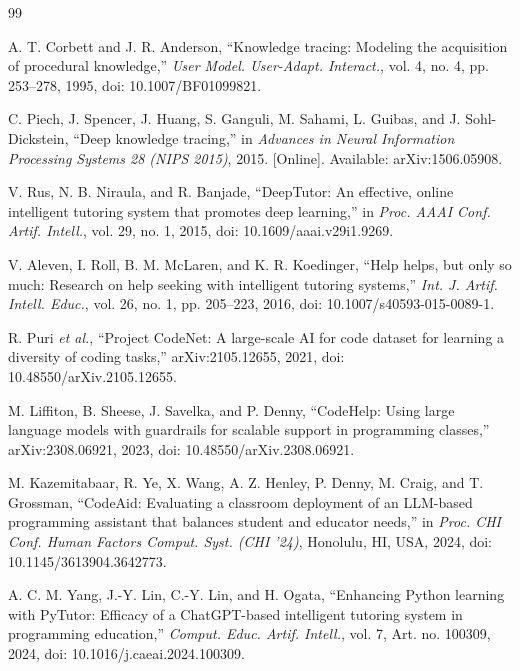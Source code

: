 \renewcommand{\bibname}{References}

\begin{thebibliography}{99}
{}

\setlength{\itemsep}{6pt}
\setlength{\parskip}{0pt}

A. T. Corbett and J. R. Anderson,
``Knowledge tracing: Modeling the acquisition of procedural knowledge,''
\textit{User Model. User-Adapt. Interact.},
vol. 4, no. 4, pp. 253--278,
1995, doi: 10.1007/BF01099821.

C. Piech, J. Spencer, J. Huang, S. Ganguli, M. Sahami, L. Guibas, and J. Sohl-Dickstein,
``Deep knowledge tracing,''
in \textit{Advances in Neural Information Processing Systems 28 (NIPS 2015)},
2015. [Online]. Available: arXiv:1506.05908.

V. Rus, N. B. Niraula, and R. Banjade,
``DeepTutor: An effective, online intelligent tutoring system that promotes deep learning,''
in \textit{Proc. AAAI Conf. Artif. Intell.},
vol. 29, no. 1, 2015,
doi: 10.1609/aaai.v29i1.9269.

V. Aleven, I. Roll, B. M. McLaren, and K. R. Koedinger,
``Help helps, but only so much: Research on help seeking with intelligent tutoring systems,''
\textit{Int. J. Artif. Intell. Educ.},
vol. 26, no. 1, pp. 205--223,
2016, doi: 10.1007/s40593-015-0089-1.

R. Puri \textit{et al.},
``Project CodeNet: A large-scale AI for code dataset for learning a diversity of coding tasks,''
arXiv:2105.12655, 2021,
doi: 10.48550/arXiv.2105.12655.

M. Liffiton, B. Sheese, J. Savelka, and P. Denny,
``CodeHelp: Using large language models with guardrails for scalable support in programming classes,''
arXiv:2308.06921, 2023,
doi: 10.48550/arXiv.2308.06921.

M. Kazemitabaar, R. Ye, X. Wang, A. Z. Henley, P. Denny, M. Craig, and T. Grossman,
``CodeAid: Evaluating a classroom deployment of an LLM-based programming assistant that balances student and educator needs,''
in \textit{Proc. CHI Conf. Human Factors Comput. Syst. (CHI '24)},
Honolulu, HI, USA, 2024,
doi: 10.1145/3613904.3642773.

A. C. M. Yang, J.-Y. Lin, C.-Y. Lin, and H. Ogata,
``Enhancing Python learning with PyTutor: Efficacy of a ChatGPT-based intelligent tutoring system in programming education,''
\textit{Comput. Educ. Artif. Intell.},
vol. 7,
Art. no. 100309, 2024,
doi: 10.1016/j.caeai.2024.100309.


\end{thebibliography}
